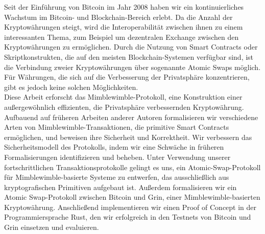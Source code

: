 \documentclass[draft,final]{vutinfth} %
\theoremstyle{definition}
\begin{document}
\begin{kurzfassung}
Seit der Einführung von Bitcoin im Jahr 2008 haben wir ein kontinuierliches Wachstum im Bitcoin- und Blockchain-Bereich erlebt. Da die Anzahl der Kryptowährungen steigt, wird die Interoperabilität zwischen ihnen zu einem interessanten Thema, zum Beispiel um dezentralen Exchange zwischen den Kryptowährungen zu ermöglichen. Durch die Nutzung von Smart Contracts oder Skriptkonstrukten, die auf den meisten Blockchain-Systemen verfügbar sind, ist die Verbindung zweier Kryptowährungen über sogenannte Atomic Swaps möglich. Für Währungen, die sich auf die Verbesserung der Privatsphäre konzentrieren, gibt es jedoch keine solchen Möglichkeiten.\\ Diese Arbeit erforscht das Mimblewimble-Protokoll, eine Konstruktion einer außergewöhnlich effizienten, die Privatsphäre verbessernden Kryptowährung. Aufbauend auf früheren Arbeiten anderer Autoren formalisieren wir verschiedene Arten von Mimblewimble-Transaktionen, die primitive Smart Contracts ermöglichen, und beweisen ihre Sicherheit und Korrektheit. Wir verbessern das Sicherheitsmodell des Protokolls, indem wir eine Schwäche in früheren Formalisierungen identifizieren und beheben. Unter Verwendung unserer fortschrittlichen Transaktionsprotokolle gelingt es uns, ein Atomic-Swap-Protokoll für Mimblewimble-basierte Systeme zu entwerfen, das ausschließlich aus kryptografischen Primitiven aufgebaut ist. Außerdem formalisieren wir ein Atomic Swap-Protokoll zwischen Bitcoin und Grin, einer Mimblewimble-basierten Kryptowährung. Anschließend implementieren wir einen Proof of Concept in der Programmiersprache Rust, den wir erfolgreich in den Testnets von Bitcoin und Grin einsetzen und evaluieren.
\end{kurzfassung}
\end{document}
